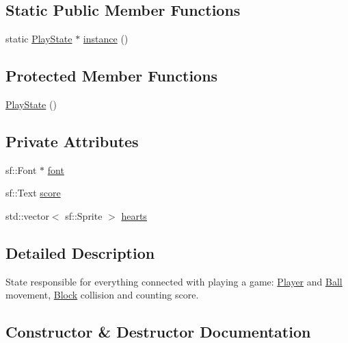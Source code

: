 \subsection*{Static Public Member Functions}
\begin{DoxyCompactItemize}
\item 
static \mbox{\hyperlink{class_play_state}{Play\+State}} $\ast$ \mbox{\hyperlink{class_play_state_a6a46a82e229d66dae0c68244faa7ade3}{instance}} ()
\end{DoxyCompactItemize}
\subsection*{Protected Member Functions}
\begin{DoxyCompactItemize}
\item 
\mbox{\hyperlink{class_play_state_a4d5a25203cf9f78f64143328097fa8c4}{Play\+State}} ()
\end{DoxyCompactItemize}
\subsection*{Private Attributes}
\begin{DoxyCompactItemize}
\item 
sf\+::\+Font $\ast$ \mbox{\hyperlink{class_play_state_a72f2eb472360c9a4e197c56ab9eaa5bb}{font}}
\item 
sf\+::\+Text \mbox{\hyperlink{class_play_state_a7650bd53de2203e1d9364b9dc09bcf31}{score}}
\item 
std\+::vector$<$ sf\+::\+Sprite $>$ \mbox{\hyperlink{class_play_state_a3180d954e9ee3b6b0ada1f69e39dcd2e}{hearts}}
\end{DoxyCompactItemize}


\subsection{Detailed Description}
State responsible for everything connected with playing a game\+: \mbox{\hyperlink{class_player}{Player}} and \mbox{\hyperlink{class_ball}{Ball}} movement, \mbox{\hyperlink{class_block}{Block}} collision and counting score. 

\subsection{Constructor \& Destructor Documentation}
\mbox{\label{class_play_state_a4d5a25203cf9f78f64143328097fa8c4}} 
